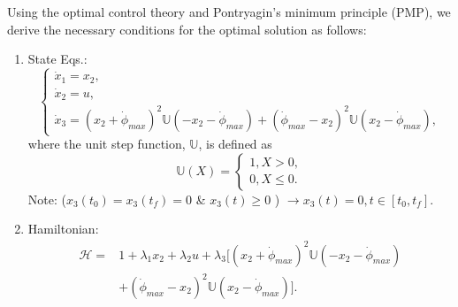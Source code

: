 \documentclass[journal ]{new-aiaa}
\begin{document}
	Using the optimal control theory and Pontryagin's minimum principle (PMP), we derive the necessary conditions for the optimal solution as follows:
	\begin{enumerate}
		\item State Eqs.:
		\begin{equation}
		\left\{
		\begin{array}{l}
		\dot{x}_1=x_2, \\
		\dot{x}_2=u, \\
		\dot{x}_3=(x_2+\dot{\phi}_{max})^2\mathbb{U}(-x_2-\dot{\phi}_{max})+(\dot{\phi}_{max}-x_2)^2\mathbb{U}(x_2-\dot{\phi}_{max}),
		\end{array}
		\right.
		\end{equation}
		where the unit step function, $\mathbb{U}$, is defined as
		\begin{equation}
		\mathbb{U}(X)=\left\{
		\begin{array}{l}
		1,   X>0, \\
		0,   X\leq 0.
		\end{array}
		\right.
		\end{equation}
		Note:  ($x_3(t_0)=x_3(t_f)=0$ \& $x_3(t)\geq 0$ ) $\rightarrow x_3(t)=0, t\in[t_0, t_f]$. 
		
		\item Hamiltonian:
		\begin{equation}
		\begin{split}
		\mathscr{H}=& 1+\lambda_1x_2+\lambda_2u+\lambda_3\Big[(x_2+\dot{\phi}_{max})^2\mathbb{U}(-x_2-\dot{\phi}_{max})\\
		& +(\dot{\phi}_{max}-x_2)^2\mathbb{U}(x_2-\dot{\phi}_{max})\Big].
		\end{split}
		\end{equation}
		
		

\end{enumerate}
\end{document}
